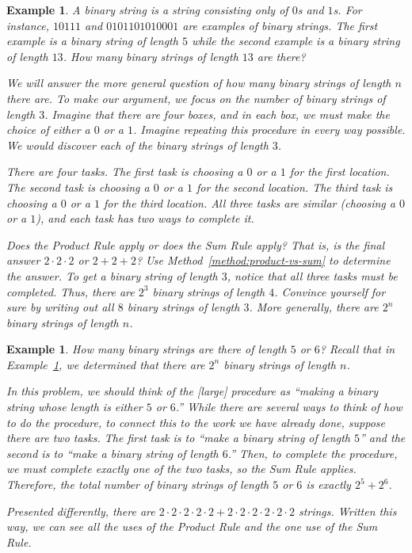 \documentclass{book}
\newcounter{ekcounter}%
\theoremstyle{ekimcustom}
\newtheorem{example}[ekcounter]{Example}
\begin{document}
\begin{example}\label{example:binary-string-n}
A binary string is a string consisting only of $0$s and $1$s. For instance, $10111$ and $0101101010001$ are examples of binary strings. The first example is a binary string of length $5$ while the second example is a binary string of length $13$. How many binary strings of length $13$ are there?

We will answer the more general question of how many binary strings of length $n$ there are. To make our argument, we focus on the number of binary strings of length $3$. Imagine that there are four boxes, and in each box, we must make the choice of either a $0$ or a $1$. Imagine repeating this procedure in every way possible. We would discover each of the binary strings of length $3$.

There are four tasks. The first task is choosing a $0$ or a $1$ for the first location. The second task is choosing a $0$ or a $1$ for the second location. The third task is choosing a $0$ or a $1$ for the third location. All three tasks are similar (choosing a $0$ or a $1$), and each task has two ways to complete it.

Does the Product Rule apply or does the Sum Rule apply? That is, is the final answer $2\cdot2\cdot2$ or $2+2+2$? Use Method~\ref{method:product-vs-sum} to determine the answer. To get a binary string of length $3$, notice that all three tasks must be completed. Thus, there are $2^3$ binary strings of length $4$. Convince yourself for sure by writing out all $8$ binary strings of length $3$. More generally, there are $2^n$ binary strings of length $n$.
\end{example}

\begin{example}\label{example:binary5or6}
How many binary strings are there of length $5$ or $6$? Recall that in Example~\ref{example:binary-string-n}, we determined that there are $2^n$ binary strings of length $n$.

In this problem, we should think of the [large] procedure as ``making a binary string whose length is either $5$ or $6$.'' While there are several ways to think of how to do the procedure, to connect this to the work we have already done, suppose there are two tasks. The first task is to ``make a binary string of length $5$'' and the second is to ``make a binary string of length $6$.'' Then, to complete the procedure, we must complete exactly one of the two tasks, so the Sum Rule applies. Therefore, the total number of binary strings of length $5$ or $6$ is exactly $2^5+2^6$.

Presented differently, there are $2\cdot2\cdot2\cdot2\cdot2 + 2\cdot2\cdot2\cdot2\cdot2\cdot2$ strings. Written this way, we can see all the uses of the Product Rule and the one use of the Sum Rule.
\end{example}
\end{document}
